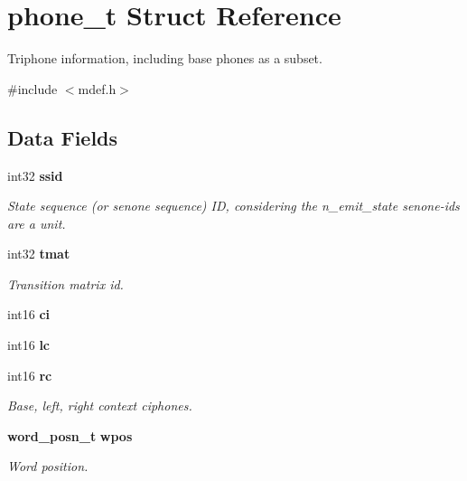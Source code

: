 \section{phone\+\_\+t Struct Reference}
\label{structphone__t}


Triphone information, including base phones as a subset.  




{\ttfamily \#include $<$mdef.\+h$>$}

\subsection*{Data Fields}
\begin{DoxyCompactItemize}
\item 
int32 {\bf ssid}
\begin{DoxyCompactList}\small\item\em State sequence (or senone sequence) I\+D, considering the n\+\_\+emit\+\_\+state senone-\/ids are a unit. \end{DoxyCompactList}\item 
int32 {\bf tmat}\label{structphone__t_acbe38b7fc991bfbcb745fb6131d812f0}

\begin{DoxyCompactList}\small\item\em Transition matrix id. \end{DoxyCompactList}\item 
int16 {\bfseries ci}\label{structphone__t_a0a895c57dccac46699fa3589e42b21d5}

\item 
int16 {\bfseries lc}\label{structphone__t_a2a473afd43114648de71a9444aa54641}

\item 
int16 {\bf rc}\label{structphone__t_a334106cbedf3d95a6bdebc4704e028cd}

\begin{DoxyCompactList}\small\item\em Base, left, right context ciphones. \end{DoxyCompactList}\item 
{\bf word\+\_\+posn\+\_\+t} {\bf wpos}\label{structphone__t_a5436db1dd178ef5ead83359c84963c83}

\begin{DoxyCompactList}\small\item\em Word position. \end{DoxyCompactList}\end{DoxyCompactItemize}


